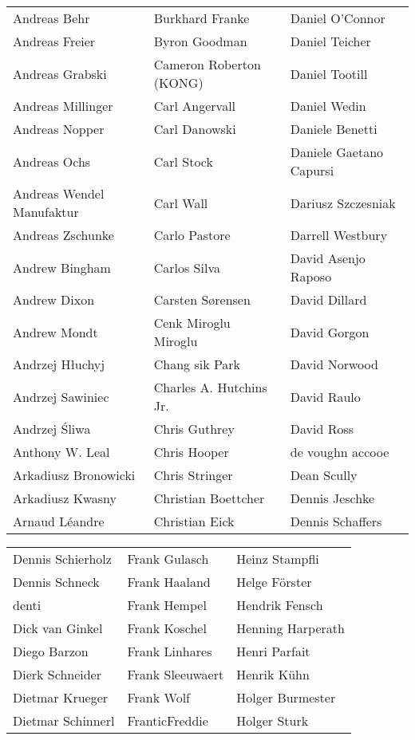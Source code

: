 \begin{small}
\begin{tabular}{p{4cm}p{4cm}p{4cm}}
Andreas Behr & Burkhard Franke & Daniel O'Connor \\
Andreas Freier & Byron Goodman & Daniel Teicher \\
Andreas Grabski & Cameron Roberton (KONG) & Daniel Tootill \\
Andreas Millinger & Carl Angervall & Daniel Wedin \\
Andreas Nopper & Carl Danowski & Daniele Benetti \\
Andreas Ochs & Carl Stock & Daniele Gaetano Capursi \\
Andreas Wendel Manufaktur & Carl Wall & Dariusz Szczesniak \\
Andreas Zschunke & Carlo Pastore & Darrell Westbury \\
Andrew Bingham & Carlos Silva & David Asenjo Raposo \\
Andrew Dixon & Carsten Sørensen & David Dillard \\
Andrew Mondt & Cenk Miroglu Miroglu & David Gorgon \\
Andrzej Hłuchyj & Chang sik Park & David Norwood \\
Andrzej Sawiniec & Charles A. Hutchins Jr. & David Raulo \\
Andrzej Śliwa & Chris Guthrey & David Ross \\
Anthony W. Leal & Chris Hooper & de voughn accooe \\
Arkadiusz Bronowicki & Chris Stringer & Dean Scully \\
Arkadiusz Kwasny & Christian Boettcher & Dennis Jeschke \\
Arnaud Léandre & Christian Eick & Dennis Schaffers \\
\end{tabular}
\newpage
\setlength{\tabcolsep}{1mm}
\begin{tabular}{p{4cm}p{4cm}p{4cm}}
Dennis Schierholz & Frank Gulasch & Heinz Stampfli \\
Dennis Schneck & Frank Haaland & Helge Förster \\
denti & Frank Hempel & Hendrik Fensch \\
Dick van Ginkel & Frank Koschel & Henning Harperath \\
Diego Barzon & Frank Linhares & Henri Parfait \\
Dierk Schneider & Frank Sleeuwaert & Henrik Kühn \\
Dietmar Krueger & Frank Wolf & Holger Burmester \\
Dietmar Schinnerl & FranticFreddie & Holger Sturk \\

\end{tabular}
\end{small}
